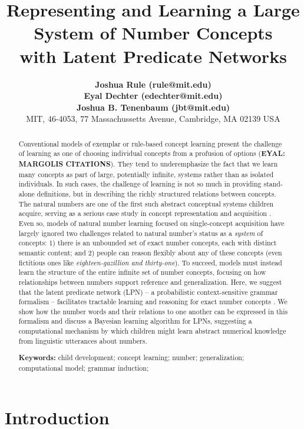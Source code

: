\documentclass[10pt,letterpaper]{article}
\title{Representing and Learning a Large System of Number Concepts \\ with Latent Predicate Networks}
\author{
  {\large \bf Joshua Rule (rule@mit.edu)}\\
  {\large \bf Eyal Dechter (edechter@mit.edu)}\\
  {\large \bf Joshua B. Tenenbaum (jbt@mit.edu)}\\
  MIT, 46-4053, 77 Massachussetts Avenue, Cambridge, MA 02139 USA}
\begin{document}
\maketitle

\begin{abstract}
  Conventional models of exemplar or rule-based concept learning
  present the challenge of learning as one of choosing individual
  concepts from a profusion of options ({\bf EYAL: MARGOLIS
    CITATIONS}). They tend to underemphasize the fact that we learn
  many concepts as part of large, potentially infinite, systems rather
  than as isolated individuals. In such cases, the challenge of
  learning is not so much in providing stand-alone definitions, but in
  describing the richly structured relations between concepts. The
  natural numbers are one of the first such abstract conceptual
  systems children acquire, serving as a serious case study in concept
  representation and acquisition
  \citep{fuson1988children,galGel2005,Car2009}. Even so, models of
  natural number learning focused on single-concept acquisition have
  largely ignored two challenges related to natural number's status as
  a \emph{system} of concepts: 1) there is an unbounded set of exact
  number concepts, each with distinct semantic content; and 2) people
  can reason flexibly about any of these concepts (even fictitious
  ones like \emph{eighteen-gazillion and thirty-one}). To succeed,
  models must instead learn the structure of the entire infinite set
  of number concepts, focusing on how relationships between numbers
  support reference and generalization. Here, we suggest that the
  latent predicate network (LPN) -- a probabilistic context-sensitive
  grammar formalism -- facilitates tractable learning and reasoning
  for exact number concepts \citep{DecRulTen2015}. We show how the
  number words and their relations to one another can be expressed in
  this formalism and discuss a Bayesian learning algorithm for LPNs,
  suggesting a computational mechanism by which children might learn
  abstract numerical knowledge from linguistic utterances about
  numbers.

  \textbf{Keywords:}
  child development; concept learning; number; generalization;
  computational model; grammar induction;
\end{abstract}

\section{Introduction}
\end{document}
